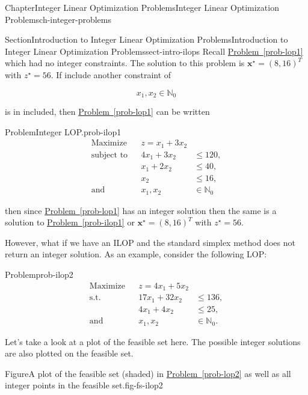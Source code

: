 \documentclass[oneside,10pt,]{book}
\newcommand{\xreffont}{\relax}
\numberwithin{equation}{section}
\newcommand{\amp}{&}
\begin{document}
\begin{chapterptx}{Chapter}{Integer Linear Optimization Problems}{}{Integer Linear Optimization Problems}{}{}{ch-integer-problems}
\begin{sectionptx}{Section}{Introduction to Integer Linear Optimization Problems}{}{Introduction to Integer Linear Optimization Problems}{}{}{sect-intro-ilops}
Recall \hyperref[prob-lop1]{Problem~{\xreffont\ref{prob-lop1}}} which had no integer constraints. The solution to this problem is \(\boldsymbol{x}^{\star}=(8,16)^{T}\) with \(z^{\star}= 56\). If include another constraint of%
\par
%
\begin{equation*}
x_1, x_2 \in \mathbb{N}_0
\end{equation*}
%
\par
is in included,  then \hyperref[prob-lop1]{Problem~{\xreffont\ref{prob-lop1}}} can be written%
\begin{problem}{Problem}{Integer LOP.}{prob-ilop1}%
%
\begin{equation*}
\begin{aligned} \text{Maximize} \amp \amp z = x_1 + 3x_2 \amp \\ \text{subject to} \amp \amp 4x_1 + 3x_2 \amp \leq 120,  \\ \amp \amp x_1 + 2x_2 \amp \leq 40, \\ \amp \amp x_2 \amp \leq 16, \\ \text{and} \amp \amp x_1, x_2 \amp \in \mathbb{N}_0 \end{aligned}
\end{equation*}
%
\end{problem}
then since \hyperref[prob-lop1]{Problem~{\xreffont\ref{prob-lop1}}} has an integer solution then the same is a solution to \hyperref[prob-ilop1]{Problem~{\xreffont\ref{prob-ilop1}}} or  \(\boldsymbol{x}^{\star}=(8,16)^{T}\) with \(z^{\star}= 56\).%
\par
However, what if we have an ILOP and the standard simplex method does not return an integer solution. As an example, consider the following LOP:%
\begin{problem}{Problem}{}{prob-ilop2}%
%
\begin{equation*}
\begin{aligned} \text{Maximize} \amp\amp z = 4x_1 + 5x_2 \amp  \\ \text{s.t.}\amp\amp 17x_1+32x_2 \amp \leq 136, \\ \amp\amp 4x_1 + 4x_2  \amp \leq 25, \\ \text{and}\amp\amp x_1, x_2 \amp  \in \mathbb{N}_0.
\end{aligned}
\end{equation*}
%
\end{problem}
Let's take a look at a plot of the feasible set here.  The possible integer solutions are also plotted on the feasible set.%
\begin{figureptx}{Figure}{A plot of the feasible set (shaded) in \hyperref[prob-lop2]{Problem~{\xreffont\ref{prob-lop2}}} as well as all integer points in the feasible set.}{fig-fs-ilop2}{}%

\end{figureptx}
\end{sectionptx}
\end{chapterptx}
\end{document}

